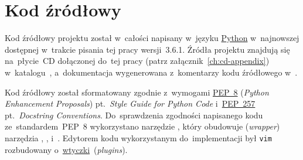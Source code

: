 \documentclass[thesis]{subfiles}
\begin{document}

\section{Kod źródłowy}

Kod źródłowy projektu został w~całości napisany w~języku \href{https://en.wikipedia.org/wiki/Python_(programming_language)}{Python} w~najnowszej dostępnej w~trakcie pisania tej pracy wersji~3.6.1. Źródła projektu znajdują się na~płycie~CD dołączonej do~tej pracy (patrz załącznik~\ref{ch:cd-appendix}) w~katalogu~, a~dokumentacja wygenerowana z~komentarzy kodu źródłowego w~.

Kod źródłowy został sformatowany zgodnie z~wymogami \href{https://www.python.org/dev/peps/pep-0008/}{PEP~8} (\emph{Python Enhancement Proposals}) pt.~\emph{Style Guide for Python Code} i~\href{https://www.python.org/dev/peps/pep-0257/}{PEP~257} pt.~\emph{Docstring Conventions}. Do~sprawdzenia zgodności napisanego kodu ze~standardem~PEP~8 wykorzystano narzędzie , który obudowuje (\emph{wrapper}) narzędzia , ,  i~. Edytorem kodu wykorzystanym do~implementacji był \texttt{vim} rozbudowany o~\href{http://vimawesome.com/}{wtyczki}~(\emph{plugins}).
\end{document}
